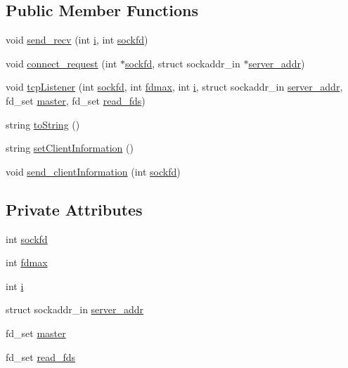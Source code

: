 \subsection*{Public Member Functions}
\begin{DoxyCompactItemize}
\item 
void \hyperlink{class_client_a7d7ba78b63357fe2c7566018e30e9767}{send\+\_\+recv} (int \hyperlink{class_client_a8086f64d20f268817ef23bc81cbea059}{i}, int \hyperlink{class_client_ab0cf9b759ba4da79ccb0a64242d944c4}{sockfd})
\item 
void \hyperlink{class_client_a63a0074432524094592cc95ec3b8c31c}{connect\+\_\+request} (int $\ast$\hyperlink{class_client_ab0cf9b759ba4da79ccb0a64242d944c4}{sockfd}, struct sockaddr\+\_\+in $\ast$\hyperlink{class_client_a3787f155329f63a3bae120e9deca92d6}{server\+\_\+addr})
\item 
void \hyperlink{class_client_a3e98bb9f68d2fc456e772bb88df85374}{tcp\+Listener} (int \hyperlink{class_client_ab0cf9b759ba4da79ccb0a64242d944c4}{sockfd}, int \hyperlink{class_client_a99ae6181165c7b5119a4c93f3b1908c8}{fdmax}, int \hyperlink{class_client_a8086f64d20f268817ef23bc81cbea059}{i}, struct sockaddr\+\_\+in \hyperlink{class_client_a3787f155329f63a3bae120e9deca92d6}{server\+\_\+addr}, fd\+\_\+set \hyperlink{class_client_a56c611a99e0ba2a2efaddeb9ae021618}{master}, fd\+\_\+set \hyperlink{class_client_a3631a848d923649af981576df2c83506}{read\+\_\+fds})
\item 
string \hyperlink{class_client_aec25a8f180a794c7ef03cc8570598740}{to\+String} ()
\item 
string \hyperlink{class_client_a9ce44f82168a9c1952dcee11e058d413}{set\+Client\+Information} ()
\item 
void \hyperlink{class_client_a7aeddfbf62fb0044949597be14e91082}{send\+\_\+client\+Information} (int \hyperlink{class_client_ab0cf9b759ba4da79ccb0a64242d944c4}{sockfd})
\end{DoxyCompactItemize}
\subsection*{Private Attributes}
\begin{DoxyCompactItemize}
\item 
int \hyperlink{class_client_ab0cf9b759ba4da79ccb0a64242d944c4}{sockfd}
\item 
int \hyperlink{class_client_a99ae6181165c7b5119a4c93f3b1908c8}{fdmax}
\item 
int \hyperlink{class_client_a8086f64d20f268817ef23bc81cbea059}{i}
\item 
struct sockaddr\+\_\+in \hyperlink{class_client_a3787f155329f63a3bae120e9deca92d6}{server\+\_\+addr}
\item 
fd\+\_\+set \hyperlink{class_client_a56c611a99e0ba2a2efaddeb9ae021618}{master}
\item 
fd\+\_\+set \hyperlink{class_client_a3631a848d923649af981576df2c83506}{read\+\_\+fds}
\end{DoxyCompactItemize}


